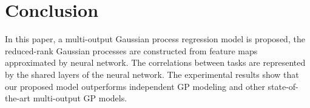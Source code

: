 \section{Conclusion}\label{sec:conclusion}

In this paper, a multi-output Gaussian process regression model is proposed, the reduced-rank Gaussian processes are constructed from feature maps approximated by neural network. The correlations between tasks are represented by the shared layers of the neural network. The experimental results show that our proposed model outperforms independent GP modeling and other state-of-the-art multi-output GP models.

